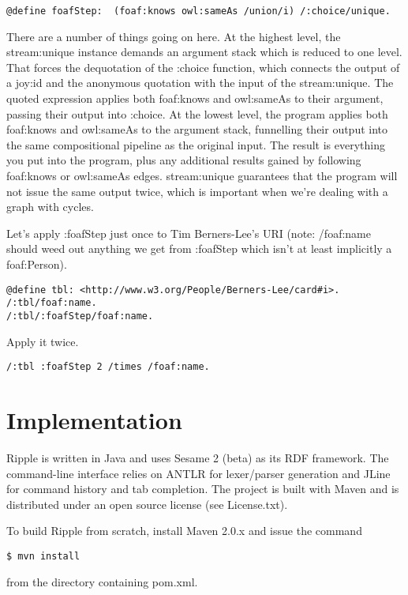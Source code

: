 \documentclass[runningheads]{llncs}
\begin{document}
\begin{verbatim}
@define foafStep:  (foaf:knows owl:sameAs /union/i) /:choice/unique.
\end{verbatim}

There are a number of things going on here.  At the highest level, the stream:unique instance demands an argument stack which is reduced to one level.  That forces the dequotation of the :choice function, which connects
the output of a joy:id and the anonymous quotation with the input of the stream:unique.  The quoted expression applies both foaf:knows and owl:sameAs to their argument, passing their output into :choice.  At the lowest level, the program
applies both foaf:knows and owl:sameAs to the argument stack, funnelling their output into the same compositional
pipeline as the original input.  The result is everything you put into the program, plus any additional results gained by following foaf:knows or owl:sameAs edges.  stream:unique guarantees that the program will not issue the same output twice, which is important when we're dealing with a graph with cycles.

Let's apply :foafStep just once to Tim Berners-Lee's URI (note: /foaf:name should weed out anything we get from :foafStep which isn't at least implicitly a foaf:Person).

\begin{verbatim}
@define tbl: <http://www.w3.org/People/Berners-Lee/card#i>.
/:tbl/foaf:name.
/:tbl/:foafStep/foaf:name.
\end{verbatim}

Apply it twice.

\begin{verbatim}
/:tbl :foafStep 2 /times /foaf:name.
\end{verbatim}

\section{Implementation}

Ripple is written in Java and uses Sesame 2 (beta) as its RDF framework.  The
command-line interface relies on ANTLR for lexer/parser generation and JLine for
command history and tab completion.  The project is built with Maven and is
distributed under an open source license (see License.txt).

To build Ripple from scratch, install Maven 2.0.x and issue the command

\begin{verbatim}
$ mvn install
\end{verbatim}

from the directory containing pom.xml.
\end{document}
